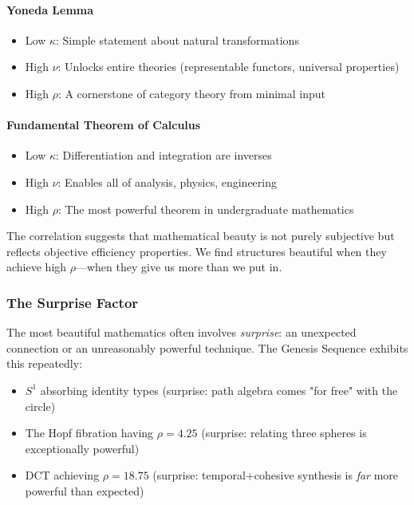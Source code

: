 \documentclass[11pt]{article}
\theoremstyle{definition}
\begin{document}
\paragraph{Yoneda Lemma}
\begin{itemize}
\item Low $\kappa$: Simple statement about natural transformations
\item High $\nu$: Unlocks entire theories (representable functors, universal properties)
\item High $\rho$: A cornerstone of category theory from minimal input
\end{itemize}

\paragraph{Fundamental Theorem of Calculus}
\begin{itemize}
\item Low $\kappa$: Differentiation and integration are inverses
\item High $\nu$: Enables all of analysis, physics, engineering
\item High $\rho$: The most powerful theorem in undergraduate mathematics
\end{itemize}

The correlation suggests that mathematical beauty is not purely subjective but reflects objective efficiency properties. We find structures beautiful when they achieve high $\rho$—when they give us more than we put in.

\subsubsection{The Surprise Factor}

The most beautiful mathematics often involves \emph{surprise}: an unexpected connection or an unreasonably powerful technique. The Genesis Sequence exhibits this repeatedly:

\begin{itemize}
\item $S^1$ absorbing identity types (surprise: path algebra comes "for free" with the circle)
\item The Hopf fibration having $\rho=4.25$ (surprise: relating three spheres is exceptionally powerful)
\item DCT achieving $\rho=18.75$ (surprise: temporal+cohesive synthesis is \emph{far} more powerful than expected)
\end{itemize}
\end{document}
